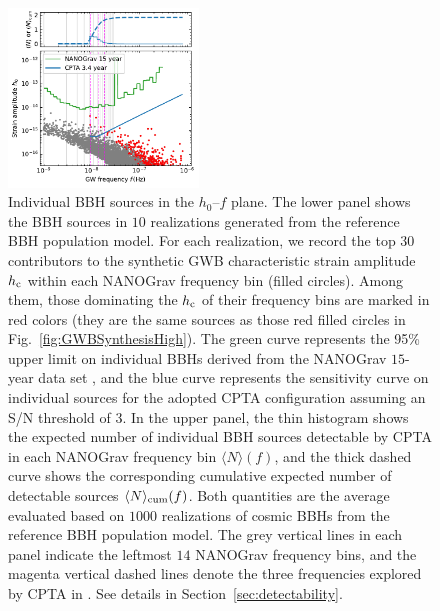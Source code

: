 \documentclass[twocolumn]{aastex631}
\newcommand{\rmc}{_{\rm c}}
\begin{document}
\begin{figure}[!htb]
%
\centering
%
\includegraphics[width=0.45\textwidth]{f3.pdf}
%
\caption{Individual BBH sources in the $h_0$--$f$ plane. The lower panel shows
the BBH sources in $10$ realizations generated from the reference BBH population
model. For each realization, we record the top $30$ contributors to the
synthetic GWB characteristic strain amplitude $h\rmc$ within each NANOGrav
frequency bin (filled circles). Among them, those dominating the $h\rmc$ of
their frequency bins are marked in red colors (they are the same sources as
those red filled circles in Fig.~\ref{fig:GWBSynthesisHigh}). The green curve
represents the 95\% upper limit on individual BBHs derived from the NANOGrav
$15$-year data set \citep{NG23indv}, and the blue curve represents the
sensitivity curve on individual sources for the adopted CPTA configuration
assuming an S/N threshold of $3$. In the upper panel, the thin histogram shows
the expected number of individual BBH sources detectable by CPTA in each
NANOGrav frequency bin $\langle N\rangle(f)$, and the thick dashed curve shows
the corresponding cumulative expected number of detectable sources $\langle
N\rangle_{\rm cum}(f)$. Both quantities are the average evaluated based on
$1000$ realizations of cosmic BBHs from the reference BBH population model. The
grey vertical lines in each panel indicate the leftmost $14$ NANOGrav frequency
bins, and the magenta vertical dashed lines denote the three frequencies
explored by CPTA in \citet{CPTA23hd}. See details in
Section~\ref{sec:detectability}.}
%
\label{fig:LoudConstrained}
%
\end{figure}
\end{document}
